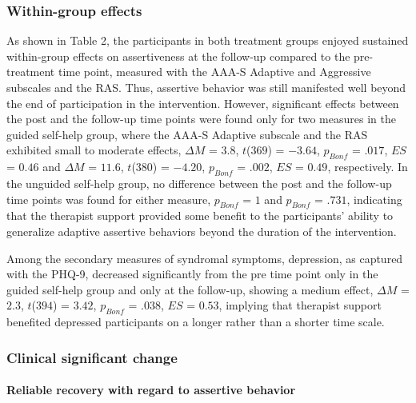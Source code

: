 \documentclass[preprint,
3p]{elsarticle} %
\begin{document}
\hypertarget{within-group-effects}{%
\subsubsection{Within-group effects}\label{within-group-effects}}

As shown in Table 2, the participants in both treatment groups enjoyed
sustained within-group effects on assertiveness at the follow-up
compared to the pre-treatment time point, measured with the AAA-S
Adaptive and Aggressive subscales and the RAS. Thus, assertive behavior
was still manifested well beyond the end of participation in the
intervention. However, significant effects between the post and the
follow-up time points were found only for two measures in the guided
self-help group, where the AAA-S Adaptive subscale and the RAS exhibited
small to moderate effects, \(\Delta M\) = \(3.8\), \(t\)(\(369\)) =
\(-3.64\), \(p_{ Bonf }\) = \(.017\), \(ES\) = \(0.46\) and \(\Delta M\)
= \(11.6\), \(t\)(\(380\)) = \(-4.20\), \(p_{ Bonf }\) = \(.002\),
\(ES\) = \(0.49\), respectively. In the unguided self-help group, no
difference between the post and the follow-up time points was found for
either measure, \(p_{ Bonf }\) = \(1\) and \(p_{ Bonf }\) = \(.731\),
indicating that the therapist support provided some benefit to the
participants' ability to generalize adaptive assertive behaviors beyond
the duration of the intervention.

Among the secondary measures of syndromal symptoms, depression, as
captured with the PHQ-9, decreased significantly from the pre time point
only in the guided self-help group and only at the follow-up, showing a
medium effect, \(\Delta M\) = \(2.3\), \(t\)(\(394\)) = \(3.42\),
\(p_{ Bonf }\) = \(.038\), \(ES\) = \(0.53\), implying that therapist
support benefited depressed participants on a longer rather than a
shorter time scale.

\hypertarget{clinical-significant-change}{%
\subsubsection{Clinical significant
change}\label{clinical-significant-change}}

\hypertarget{reliable-recovery-with-regard-to-assertive-behavior}{%
\paragraph{Reliable recovery with regard to assertive
behavior}\label{reliable-recovery-with-regard-to-assertive-behavior}}
\end{document}
